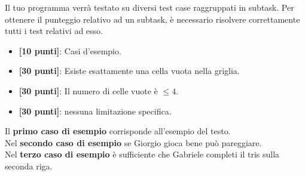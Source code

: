 \Scoring
Il tuo programma verrà testato su diversi test case raggruppati in subtask.
Per ottenere il punteggio relativo ad un subtask, è necessario risolvere
correttamente tutti i test relativi ad esso.

\begin{itemize}[nolistsep,itemsep=2mm]
  \item \textbf{ [10 punti]}: Casi d'esempio.
  \item \textbf{ [30 punti]}: Esiste esattamente una cella vuota nella griglia.
  \item \textbf{ [30 punti]}: Il numero di celle vuote è $\le 4$.
  \item \textbf{ [30 punti]}: nessuna limitazione specifica.
\end{itemize}

\Examples
\begin{example}
%
\end{example}
\begin{example}
\end{example}
\begin{example}
%
\end{example}


\Explanation
Il \textbf{primo caso di esempio} corrisponde all'esempio del testo.\\[2mm]
Nel \textbf{secondo caso di esempio} se Giorgio gioca bene può pareggiare.\\[2mm]
Nel \textbf{terzo caso di esempio} è sufficiente che Gabriele completi il tris sulla seconda riga.
